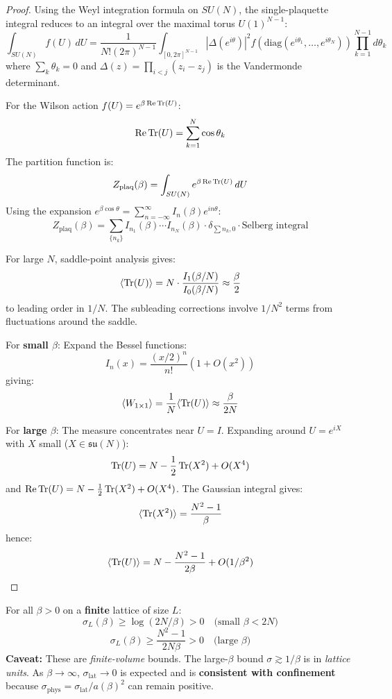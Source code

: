 \begin{proof}
Using the Weyl integration formula on $SU(N)$, the single-plaquette integral 
reduces to an integral over the maximal torus $U(1)^{N-1}$:
\[
\int_{SU(N)} f(U) \, dU = \frac{1}{N!(2\pi)^{N-1}} \int_{[0,2\pi]^{N-1}} 
|\Delta(e^{i\theta})|^2 f(\text{diag}(e^{i\theta_1}, \ldots, e^{i\theta_N})) \prod_{k=1}^{N-1} d\theta_k
\]
where $\sum_k \theta_k = 0$ and $\Delta(z) = \prod_{i<j}(z_i - z_j)$ is the 
Vandermonde determinant.

For the Wilson action $f(U) = e^{\beta \operatorname{Re}\operatorname{Tr}(U)}$:
\[
\operatorname{Re}\operatorname{Tr}(U) = \sum_{k=1}^N \cos\theta_k
\]
The partition function is:
\[
Z_{\text{plaq}}(\beta) = \int_{SU(N)} e^{\beta \operatorname{Re}\operatorname{Tr}(U)} \, dU
\]
Using the expansion $e^{\beta \cos\theta} = \sum_{n=-\infty}^\infty I_n(\beta) e^{in\theta}$:
\[
Z_{\text{plaq}}(\beta) = \sum_{\{n_k\}} I_{n_1}(\beta) \cdots I_{n_N}(\beta) \cdot 
\delta_{\sum n_k, 0} \cdot \text{Selberg integral}
\]

For large $N$, saddle-point analysis gives:
\[
\langle \operatorname{Tr}(U) \rangle = N \cdot \frac{I_1(\beta/N)}{I_0(\beta/N)} \approx \frac{\beta}{2}
\]
to leading order in $1/N$. The subleading corrections involve $1/N^2$ terms 
from fluctuations around the saddle.

For \textbf{small $\beta$}: Expand the Bessel functions:
\[
I_n(x) = \frac{(x/2)^n}{n!}\left(1 + O(x^2)\right)
\]
giving:
\[
\langle W_{1 \times 1}\rangle = \frac{1}{N}\langle \operatorname{Tr}(U)\rangle \approx \frac{\beta}{2N}
\]

For \textbf{large $\beta$}: The measure concentrates near $U = I$. Expanding 
around $U = e^{iX}$ with $X$ small ($X \in \mathfrak{su}(N)$):
\[
\operatorname{Tr}(U) = N - \frac{1}{2}\operatorname{Tr}(X^2) + O(X^4)
\]
and $\operatorname{Re}\operatorname{Tr}(U) = N - \frac{1}{2}\operatorname{Tr}(X^2) + O(X^4)$.
The Gaussian integral gives:
\[
\langle \operatorname{Tr}(X^2) \rangle = \frac{N^2 - 1}{\beta}
\]
hence:
\[
\langle \operatorname{Tr}(U) \rangle = N - \frac{N^2-1}{2\beta} + O(1/\beta^2)
\]
\end{proof}

\begin{corollary}
\label{cor:quantitative-sigma}
For all $\beta > 0$ on a \textbf{finite} lattice of size $L$:
\[
\sigma_L(\beta) \geq \log(2N/\beta) > 0 \quad \text{(small $\beta < 2N$)}
\]
\[
\sigma_L(\beta) \geq \frac{N^2-1}{2N\beta} > 0 \quad \text{(large $\beta$)}
\]
\textbf{Caveat:} These are \emph{finite-volume} bounds. The large-$\beta$ bound 
$\sigma \gtrsim 1/\beta$ is in \emph{lattice units}. As $\beta \to \infty$, 
$\sigma_{\text{lat}} \to 0$ is expected and is \textbf{consistent with confinement} 
because $\sigma_{\text{phys}} = \sigma_{\text{lat}}/a(\beta)^2$ can remain positive.
\end{corollary}


